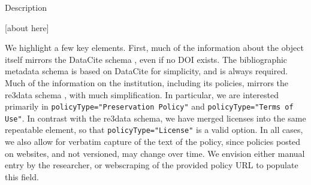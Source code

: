 \begin{table}
	\centering
	\caption{\metajelo Description\label{tab:desc:metajelo}  }
	
	[about here]
	
\end{table}

We highlight a few key elements. First, much of the information about the object itself mirrors the DataCite schema \parencite{DataCiteMetadataWorkingGroup2017,DataCiteMetadataWorkingGroup2017a}, even if no \ac{DOI} exists. The bibliographic metadata schema is based on DataCite for simplicity, and is always required. Much of the information on the institution, including its policies, mirrors the re3data schema \parencite{Re3data.Org2015,Rucknagel2015}, with much simplification. In particular, we are interested primarily in \texttt{policyType="Preservation Policy"} and \texttt{policyType="Terms of Use"}. In contrast with the re3data schema, we have merged licenses into the same repeatable element, so that \texttt{policyType="License"} is a valid option. In all cases, we also allow for verbatim capture of the text of the policy, since policies posted on websites, and not versioned, may change over time. We envision either manual entry by the researcher, or webscraping of the provided policy {URL} to populate this field.